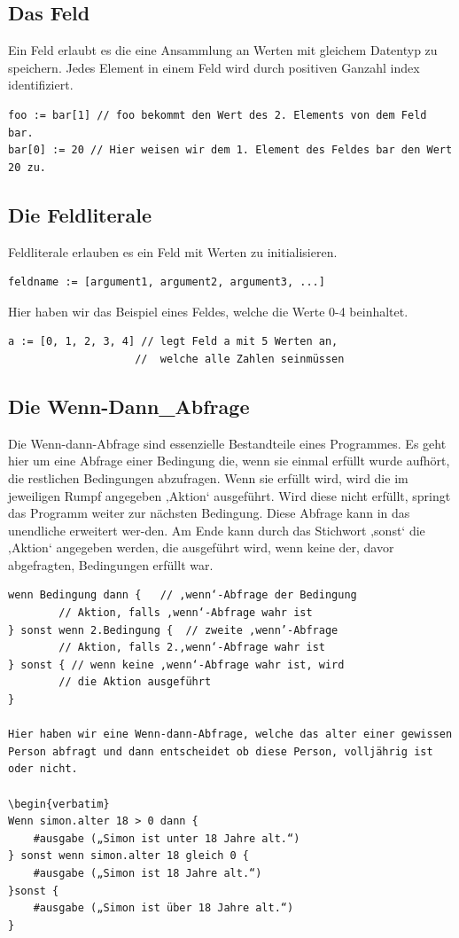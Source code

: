 \documentclass[a4paper, 12pt]{article}
\begin{document}
\subsection{Das Feld}
Ein Feld erlaubt es die eine Ansammlung an Werten mit gleichem Datentyp zu speichern. Jedes Element in einem Feld wird durch positiven Ganzahl index identifiziert.
\begin{verbatim}
foo := bar[1] // foo bekommt den Wert des 2. Elements von dem Feld bar.
bar[0] := 20 // Hier weisen wir dem 1. Element des Feldes bar den Wert 20 zu.
\end{verbatim}

\subsection{Die Feldliterale}
Feldliterale erlauben es ein Feld mit Werten zu initialisieren.

\begin{verbatim}
feldname := [argument1, argument2, argument3, ...]
\end{verbatim}
Hier haben wir das Beispiel eines Feldes, welche die Werte 0-4 beinhaltet.

\begin{verbatim}
a := [0, 1, 2, 3, 4] // legt Feld a mit 5 Werten an, 
                    //  welche alle Zahlen seinmüssen
\end{verbatim}

\subsection{Die Wenn-Dann_Abfrage}
Die Wenn-dann-Abfrage sind essenzielle Bestandteile eines Programmes. Es geht hier um eine Abfrage einer Bedingung die, wenn sie einmal erfüllt wurde aufhört, die restlichen Bedingungen abzufragen. Wenn sie erfüllt wird, wird die im jeweiligen Rumpf angegeben ‚Aktion‘ ausgeführt. Wird diese nicht erfüllt, springt das Programm weiter zur nächsten Bedingung. Diese Abfrage kann in das unendliche erweitert wer-den. Am Ende kann durch das Stichwort ‚sonst‘ die ‚Aktion‘ angegeben werden, die ausgeführt wird, wenn keine der, davor abgefragten, Bedingungen erfüllt war.

\begin{verbatim}
wenn Bedingung dann {   // ‚wenn‘-Abfrage der Bedingung
		// Aktion, falls ‚wenn‘-Abfrage wahr ist
} sonst wenn 2.Bedingung {	// zweite ‚wenn’-Abfrage 
		// Aktion, falls 2.‚wenn‘-Abfrage wahr ist
} sonst { // wenn keine ‚wenn‘-Abfrage wahr ist, wird 
		// die Aktion ausgeführt 
}

Hier haben wir eine Wenn-dann-Abfrage, welche das alter einer gewissen Person abfragt und dann entscheidet ob diese Person, volljährig ist oder nicht.

\begin{verbatim}
Wenn simon.alter 18 > 0 dann {
	#ausgabe („Simon ist unter 18 Jahre alt.“)
} sonst wenn simon.alter 18 gleich 0 {
	#ausgabe („Simon ist 18 Jahre alt.“)
}sonst {
	#ausgabe („Simon ist über 18 Jahre alt.“) 
}
\end{verbatim}
\end{document}
